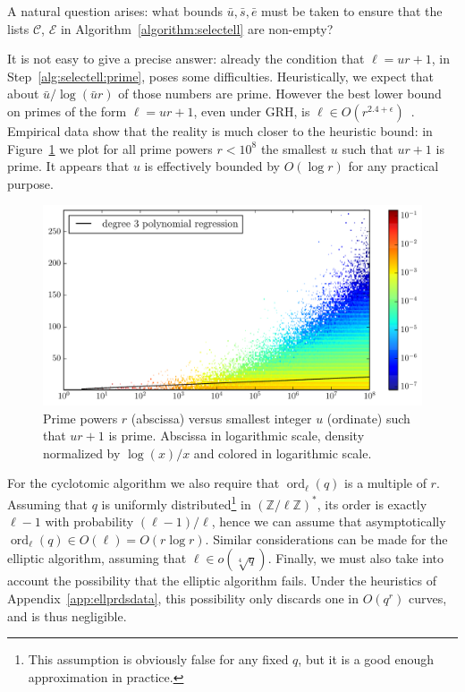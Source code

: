 \documentclass[12pt]{article}
\theoremstyle{plain}
\theoremstyle{definition}
\DeclareMathOperator{\order}{ord} %
\def\Z{\ensuremath{\mathbb{Z}}}
\newcounter{algorithm}
\begin{document}
A natural question arises: what bounds $\bar{u},\bar{s},\bar{e}$ must
be taken to ensure that the lists $\mathcal{C}$, $\mathcal{E}$ in
Algorithm~\ref{algorithm:selectell} are non-empty?

It is not easy to give a precise answer: already the condition that
$\ell=ur+1$, in Step~\ref{alg:selectell:prime}, poses some
difficulties. Heuristically, we expect that about
$\bar{u}/\log(\bar{u}r)$ of those numbers are prime. However the best
lower bound on primes of the form $\ell=ur+1$, even under GRH, is
$\ell\in O(r^{2.4+\epsilon})$~\cite{heath1992zero}. Empirical data
show that the reality is much closer to the heuristic bound: in
Figure~\ref{fig:primes-arith-prog} we plot for all prime powers
$r<10^8$ the smallest $u$ such that $ur+1$ is prime. It appears that
$u$ is effectively bounded by $O(\log r)$ for any practical purpose.


\begin{figure}
  \centering
  \includegraphics[width=\textwidth]{plots/arith_prog}
  \caption{Prime powers $r$ (abscissa) versus smallest integer $u$
    (ordinate) such that $ur+1$ is prime. Abscissa in logarithmic
    scale, density normalized by $\log(x)/x$ and colored in
    logarithmic scale.}
  \label{fig:primes-arith-prog}
\end{figure}

For the cyclotomic algorithm we also require that $\order_\ell(q)$ is
a multiple of $r$. Assuming that $q$ is uniformly
distributed\footnote{This assumption is obviously false for any fixed
  $q$, but it is a good enough approximation in practice.} in
$(\Z/\ell\Z)^\ast$, its order is exactly $\ell-1$ with probability
$(\ell-1)/\ell$, hence we can assume that asymptotically
$\order_\ell(q)\in O(\ell)=O(r\log r)$. Similar considerations can be
made for the elliptic algorithm, assuming that $\ell\in
o(\sqrt[4]{q})$.
Finally, we must also take into account the possibility that the
elliptic algorithm fails. Under the heuristics of
Appendix~\ref{app:ellprdsdata}, this possibility only discards one in
$O(q^r)$ curves, and is thus negligible.
\end{document}
